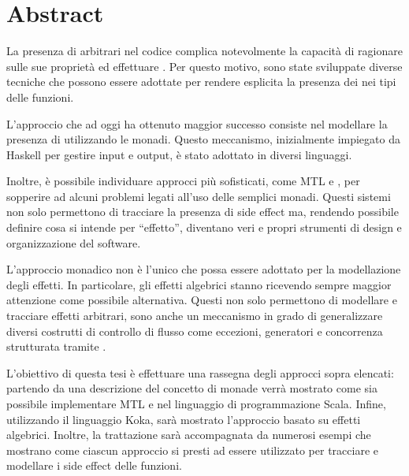 \chapter*{Abstract}

La presenza di  arbitrari nel codice complica notevolmente la capacità di ragionare sulle sue proprietà ed effettuare .
Per questo motivo, sono state sviluppate diverse tecniche che possono essere adottate per rendere esplicita la presenza dei  nei tipi delle funzioni.

L'approccio che ad oggi ha ottenuto maggior successo consiste nel modellare la presenza di  utilizzando le monadi.
Questo meccanismo, inizialmente impiegato da Haskell per gestire input e output, è stato adottato in diversi linguaggi.

Inoltre, è possibile individuare approcci più sofisticati, come MTL e , per sopperire ad alcuni problemi legati all'uso delle semplici monadi.
Questi sistemi non solo permettono di tracciare la presenza di side effect ma, rendendo possibile definire cosa si intende per ``effetto'', diventano veri e propri strumenti di design e organizzazione del software.

L'approccio monadico non è l'unico che possa essere adottato per la modellazione degli effetti. In particolare, gli effetti algebrici stanno ricevendo sempre maggior attenzione come possibile alternativa.
Questi non solo permettono di modellare e tracciare effetti arbitrari, sono anche un meccanismo in grado di generalizzare diversi costrutti di controllo di flusso come eccezioni, generatori e concorrenza strutturata tramite .

L'obiettivo di questa tesi è effettuare una rassegna degli approcci sopra elencati: partendo da una descrizione del concetto di monade verrà mostrato come sia possibile implementare MTL e  nel linguaggio di programmazione Scala.
Infine, utilizzando il linguaggio Koka, sarà mostrato l'approccio basato su effetti algebrici. Inoltre, la trattazione sarà accompagnata da numerosi esempi che mostrano come ciascun approccio si presti ad essere utilizzato per tracciare e modellare i side effect delle funzioni.
